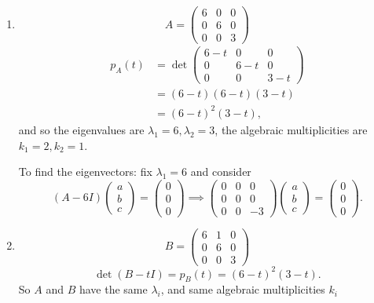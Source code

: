 \documentclass[10pt, a4paper]{article}
\begin{document}
\begin{example}\phantom{}
    \begin{enumerate}[label = (\roman*)]
        \item
        \[
        A = \begin{pmatrix}
            6 & 0 & 0 \\
            0 & 6 & 0 \\
            0 & 0 & 3
        \end{pmatrix}
        \]
        \begin{align*}
            p_A(t) &= \det\begin{pmatrix}
                6 - t & 0 & 0 \\
                0 & 6 - t & 0 \\
                0 & 0 & 3 - t
            \end{pmatrix} \\
            &= (6 - t)(6 - t)(3 - t) \\
            &= (6 - t) ^ 2(3 - t),
        \end{align*}
        and so the eigenvalues are $\lambda_1 = 6, \lambda_2 = 3$,
        the algebraic multiplicities are $k_1 = 2, k_2 = 1$.
        
        To find the eigenvectors:
        fix $\lambda_1 = 6$ and consider
        \[
        (A - 6I)\begin{pmatrix}
            a \\ b \\ c
        \end{pmatrix} = \begin{pmatrix}
            0 \\ 0 \\ 0
        \end{pmatrix} \implies \begin{pmatrix}
            0 & 0 & 0 \\
            0 & 0 & 0 \\
            0 & 0 & -3
        \end{pmatrix}\begin{pmatrix}
            a \\ b \\ c
        \end{pmatrix}
        =
        \begin{pmatrix}
            0 \\ 0 \\ 0
        \end{pmatrix}.
        \]
        \item
        \[
        B = \begin{pmatrix}
            6 & 1 & 0 \\
            0 & 6 & 0 \\
            0 & 0 & 3
        \end{pmatrix}
        \]
        \[
        \det{(B - tI)} = p_B(t) = (6 - t) ^ 2(3 - t).
        \]
        So $A$ and $B$ have the same $\lambda_i$,
        and same algebraic multiplicities $k_i$


\end{enumerate}
\end{example}
\end{document}
